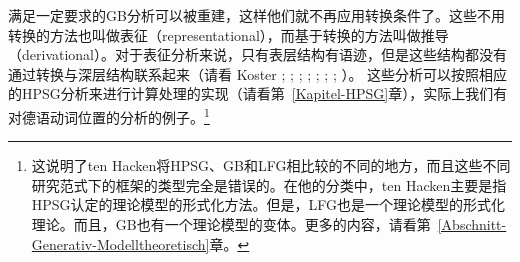 满足一定要求的GB分析\label{Seite-Representationelle-GB}可以被重建，这样他们就不再应用转换条件了。这些不用转换的方法也叫做表征（representational），而基于转换的方法叫做推导（derivational）。对于表征分析来说，只有表层结构有语迹，但是这些结构都没有通过转换与深层结构联系起来（请看\eg %
Koster \citeyear[\page ]{Koster78b-u}; \citeyear[]{Koster87a-u}; 
\citealp{KT91a}; \citealp[Section~1.4]{Haider93a}; 
\citealp[]{Frey93a}; \citealp[--88, 177--178]{Lohnstein93a-u}; \citealp[]{FC94a}; \citealp[]{Veenstra98a}）。
这些分析可以按照相应的HPSG分析来进行计算处理的实现（请看第~\ref{Kapitel-HPSG}章），实际上我们有对德语动词位置的分析的例子。\footnote{%
这说明了ten Hacken将HPSG、GB和LFG相比较的不同的地方，而且这些不同研究范式下的框架的类型完全是错误的。在他的分类中，ten  Hacken主要是指HPSG认定的理论模型的形式化方法。但是，LFG也是一个理论模型的形式化理论\citep{Kaplan95a}。而且，GB也有一个理论模型的变体\citep{Rogers98a-u}。更多的内容，请看第~\ref{Abschnitt-Generativ-Modelltheoretisch}章。
}
